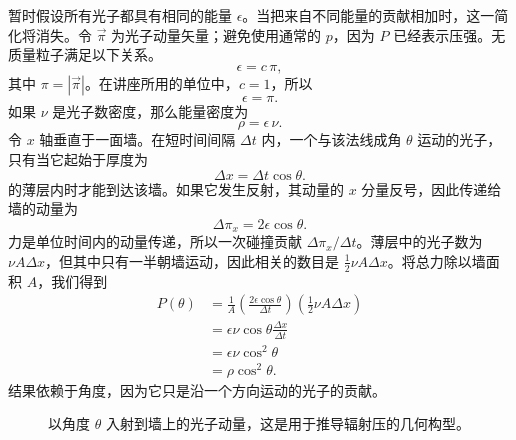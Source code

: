 暂时假设所有光子都具有相同的能量 \(\epsilon\)。当把来自不同能量的贡献相加时，这一简化将消失。令 \(\vec{\pi}\) 为光子动量矢量；避免使用通常的 \(p\)，因为 \(P\) 已经表示压强。无质量粒子满足以下关系。
\begin{equation}
\epsilon=c\,\pi,
\end{equation}
其中 \(\pi=|\vec{\pi}|\)。在讲座所用的单位中，\(c=1\)，所以
\begin{equation}
\epsilon=\pi.
\end{equation}
如果 \(\nu\) 是光子数密度，那么能量密度为
\begin{equation}
\rho=\epsilon\,\nu.
\end{equation}
令 \(x\) 轴垂直于一面墙。在短时间间隔 \(\Delta t\) 内，一个与该法线成角 \(\theta\) 运动的光子，只有当它起始于厚度为
\begin{equation}
\Delta x=\Delta t\cos\theta.
\end{equation}
的薄层内时才能到达该墙。如果它发生反射，其动量的 \(x\) 分量反号，因此传递给墙的动量为
\begin{equation}
\Delta \pi_x=2\epsilon\cos\theta.
\end{equation}
力是单位时间内的动量传递，所以一次碰撞贡献 \(\Delta \pi_x/\Delta t\)。薄层中的光子数为 \(\nu A\Delta x\)，但其中只有一半朝墙运动，因此相关的数目是 \(\tfrac12 \nu A\Delta x\)。将总力除以墙面积 \(A\)，我们得到
\begin{align}
P(\theta)
&=
\frac{1}{A}
\left(\frac{2\epsilon\cos\theta}{\Delta t}\right)
\left(\frac12 \nu A\Delta x\right) \\
&=
\epsilon\nu\cos\theta\frac{\Delta x}{\Delta t} \\
&=
\epsilon\nu\cos^2\theta \\
&=
\rho\cos^2\theta.
\end{align}
结果依赖于角度，因为它只是沿一个方向运动的光子的贡献。

\begin{figure}[htbp]
\centering
{}
\caption{以角度 \(\theta\) 入射到墙上的光子动量，这是用于推导辐射压的几何构型。}
\label{fig:c05-photon-pressure}
\end{figure}


